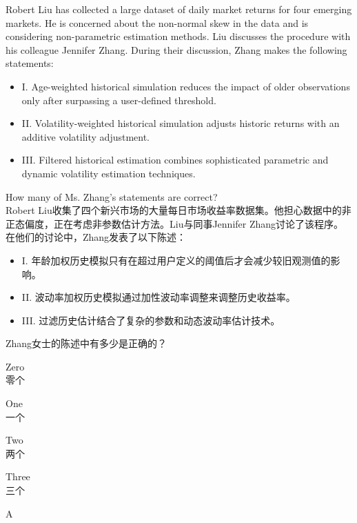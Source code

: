 \documentclass{article}
\newcounter{question} %
\begin{document}
\begin{question}
    Robert Liu has collected a large dataset of daily market returns for four emerging markets. He is concerned about the non-normal skew in the data and is considering non-parametric estimation methods. Liu discusses the procedure with his colleague Jennifer Zhang. During their discussion, Zhang makes the following statements:
\begin{itemize}
    \item I. Age-weighted historical simulation reduces the impact of older observations only after surpassing a user-defined threshold.
    \item II. Volatility-weighted historical simulation adjusts historic returns with an additive volatility adjustment.
    \item III. Filtered historical estimation combines sophisticated parametric and dynamic volatility estimation techniques.
\end{itemize}

    How many of Ms. Zhang's statements are correct?
    \\Robert Liu收集了四个新兴市场的大量每日市场收益率数据集。他担心数据中的非正态偏度，正在考虑非参数估计方法。Liu与同事Jennifer Zhang讨论了该程序。在他们的讨论中，Zhang发表了以下陈述：
    \begin{itemize}
        \item I. 年龄加权历史模拟只有在超过用户定义的阈值后才会减少较旧观测值的影响。
        \item II. 波动率加权历史模拟通过加性波动率调整来调整历史收益率。
        \item III. 过滤历史估计结合了复杂的参数和动态波动率估计技术。
    \end{itemize}
    
        Zhang女士的陈述中有多少是正确的？
\end{question}

\begin{choices}
    \item Zero\\零个
    \item One\\一个
    \item Two\\两个
    \item Three\\三个
\end{choices}

\begin{correctanswer}
    A
\end{correctanswer}
\end{document}
